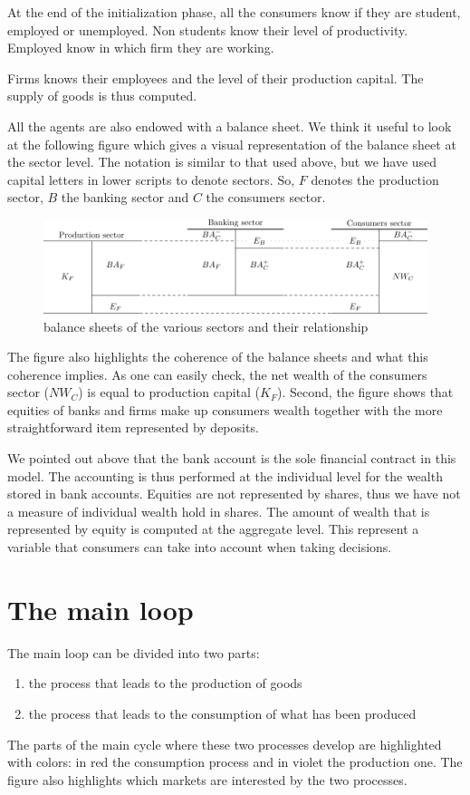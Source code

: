\documentclass{book}
\begin{document}
At the end of the initialization phase, all the consumers know if they are student, employed or unemployed. Non students know their level of productivity. Employed know in which firm they are working.

Firms knows their employees and the level of their production capital. The supply of goods is thus computed.

All the agents are also endowed with a balance sheet. We think it useful to look at the following figure which gives a visual representation of the balance sheet at the sector level. 
The notation is similar to that used above, but we have used capital letters in lower scripts to denote sectors. So, $F$ denotes the production sector, $B$ the banking sector and $C$ the consumers sector. 

\begin{figure}[htp]
	\centering
\includegraphics[scale=0.7]{manual_balances-0.pdf}
	\caption{balance sheets of the various sectors and their relationship}
	\label{fig:balances}
\end{figure}

The figure also highlights the coherence of the balance sheets and what this coherence implies. As one can easily check, the net wealth of the consumers sector ($NW_C$) is equal to production capital ($K_F$). Second, the figure shows that equities of banks and firms make up consumers wealth together with the more straightforward item represented by deposits. 

We pointed out above that the bank account is the sole financial contract in this model. The accounting is thus performed at the individual level for the wealth stored in bank accounts. Equities are not represented by shares, thus we have not a measure of individual wealth hold in shares. The amount of wealth that is represented by equity is computed at the aggregate level. This represent a variable that consumers can take into account when taking decisions.   


\newpage
\section{The main loop}\label{sec:mainloop}
The main loop can be divided into two parts:
\begin{enumerate}
	\item the process that leads to the production of goods
	\item the process that leads to the consumption of what has been produced
\end{enumerate}
The parts of the main cycle where these two processes develop are highlighted with colors: in red the consumption process and in violet the production one. The figure also highlights which markets are interested by the two processes.
\end{document}
